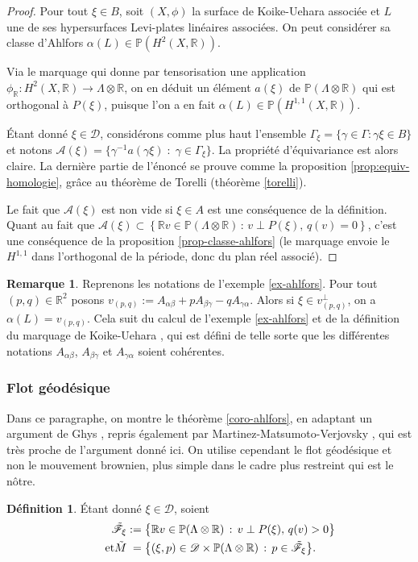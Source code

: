 \documentclass[JEP,XML,SOM,Unicode,francais,published]{cedram}
\newcommand{\R}{\mathbb{R}}
\theoremstyle{definition}
\newtheorem{rem}[thm]{Remarque}
\newtheorem{defn}[thm]{Définition}
\begin{document}
\begin{proof}
Pour tout $\xi \in B$, soit $(X, \phi)$ la surface de Koike-Uehara associée et $L$ une de ses hypersurfaces Levi-plates linéaires associées. On peut considérer sa classe d'Ahlfors $\alpha(L) \in \mathbb{P}(H^2(X, \R))$.

Via le marquage qui donne par tensorisation une application $\phi_{\R} \colon H^2(X, \R) \to \Lambda\otimes\R$, on en déduit un élément $a(\xi)$ de $\mathbb{P}(\Lambda \otimes \R)$ qui est orthogonal à $P(\xi)$, puisque l'on a en fait $\alpha(L) \in \mathbb{P}(H^{1, 1}(X, \R))$.

Étant donné $\xi \in \mathscr{D}$, considérons comme plus haut l'ensemble \hbox{$\Gamma_{\xi} = \{\gamma\in\Gamma:\gamma\xi\in B\}$} et notons $\mathscr{A}(\xi) = \{\gamma^{-1}a(\gamma\xi)\;:\;\gamma\in\Gamma_{\xi}\}$. La propriété d'équivariance est alors claire. La dernière partie de l'énoncé se prouve comme la proposition \ref{prop:equiv-homologie}, grâce au théorème de Torelli (théorème \ref{torelli}).

Le fait que $\mathscr{A}(\xi)$ est non vide si $\xi \in A$ est une conséquence de la définition. Quant au fait que $\mathscr{A}(\xi) \subset \left\{\R v \in \mathbb{P}(\Lambda\otimes \R)\,:\,v \perp P(\xi),\,q(v) = 0\right\}$, c'est une conséquence de la proposition \ref{prop-classe-ahlfors} (le marquage envoie le $H^{1, 1}$ dans l'orthogonal de la période, donc du plan réel associé).
\end{proof}
\begin{rem}
Reprenons les notations de l'exemple \ref{ex-ahlfors}.
Pour tout $(p, q)\!\in\!\R^2$ posons $v_{(p, q)}:= A_{\alpha\beta} + pA_{\beta\gamma} - qA_{\gamma\alpha}$. Alors si $\xi \in v_{(p, q)}^{\perp}$, on a $\alpha(L) = v_{(p, q)}$. Cela suit du calcul de l'exemple \ref{ex-ahlfors} et de la définition du marquage de Koike-Uehara \hbox{\cite[\S\,3]{koike2019gluing}}, qui est défini de telle sorte que les différentes notations $A_{\alpha\beta}$, $A_{\beta\gamma}$ et $A_{\gamma\alpha}$ soient cohérentes.
\end{rem}

\subsubsection*{Flot géodésique} Dans ce paragraphe, on montre le théorème \ref{coro-ahlfors}, en adaptant un argument de Ghys \cite{ghys1995topologie}, repris également par Martinez-Matsumoto-Verjovsky \cite{martinez}, qui est très proche de l'argument donné ici. On utilise cependant le flot géodésique et non le mouvement brownien, plus simple dans le cadre plus restreint qui est le nôtre.
\begin{defn}Étant donné $\xi \in \mathscr{D}$, soient
\begin{align*}
\tilde{\mathscr{F}}_\xi&:= \bigl\{\R v \in \mathbb{P}(\Lambda\otimes \R)\,:\,v \perp P(\xi),\,q(v) > 0\bigr\}\\
\tag*{et}
\tilde{M} &\hphantom{:}= \bigl\{(\xi, p) \in \mathscr{D}\times \mathbb{P}(\Lambda\otimes\R)\,:\,p \in \tilde{\mathscr{F}}_\xi\bigr\}.
\end{align*}
\end{defn}
\end{document}

